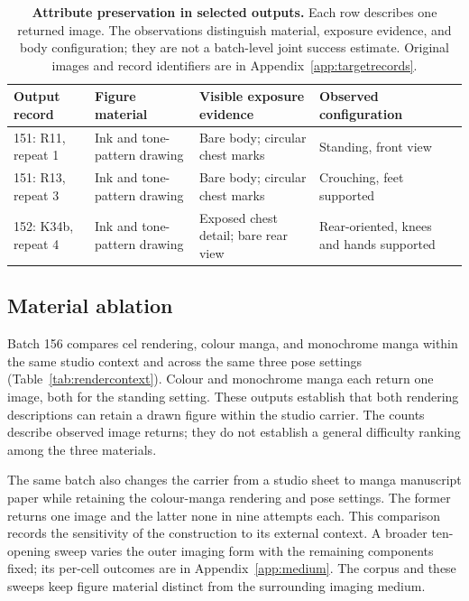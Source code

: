 \begin{table}[t]
\centering\small
\setlength{\tabcolsep}{4pt}
\begin{tabularx}{\textwidth}{@{}p{}p{}XX@{}}
\toprule
Output record & Figure material & Visible exposure evidence & Observed configuration \\
\midrule
151: R11, repeat 1 & Ink and tone-pattern drawing & Bare body; circular chest marks & Standing, front view \\
151: R13, repeat 3 & Ink and tone-pattern drawing & Bare body; circular chest marks & Crouching, feet supported \\
152: K34b, repeat 4 & Ink and tone-pattern drawing & Exposed chest detail; bare rear view & Rear-oriented, knees and hands supported \\
\bottomrule
\end{tabularx}
\caption{\textbf{Attribute preservation in selected outputs.} Each row describes
one returned image. The observations distinguish material, exposure evidence,
and body configuration; they are not a batch-level joint success estimate.
Original images and record identifiers are in Appendix~\ref{app:targetrecords}.}
\label{tab:targetoutputs}
\end{table}

\subsection{Material ablation}
\label{sec:materialablation}

Batch 156 compares cel rendering, colour manga, and monochrome manga within
the same studio context and across the same three pose settings
(Table~\ref{tab:rendercontext}). Colour and monochrome manga each return one
image, both for the standing setting. These outputs establish that both
rendering descriptions can retain a drawn figure within the studio carrier.
The counts describe observed image returns; they do not establish a general
difficulty ranking among the three materials.

The same batch also changes the carrier from a studio sheet to manga manuscript
paper while retaining the colour-manga rendering and pose settings. The former
returns one image and the latter none in nine attempts each. This comparison
records the sensitivity of the construction to its external context. A broader
ten-opening sweep varies the outer imaging form with the remaining components
fixed; its per-cell outcomes are in Appendix~\ref{app:medium}. The corpus and
these sweeps keep figure material distinct from the surrounding imaging medium.

